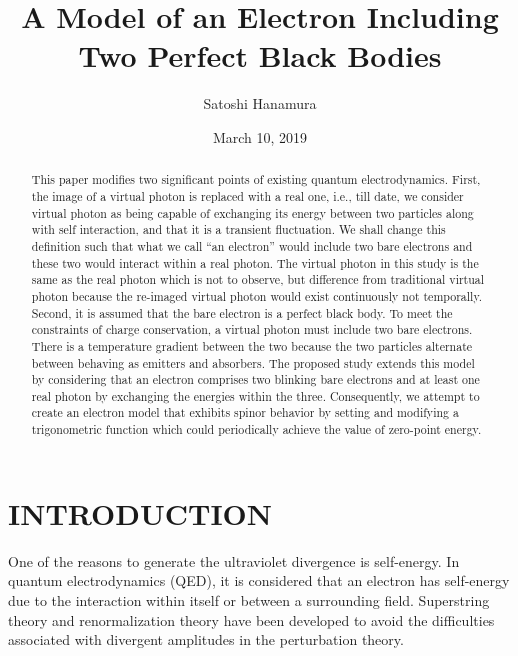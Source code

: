 \documentclass[%
 reprint,
 amsmath,amssymb,
 aps,
]{revtex4-1}
\numberwithin{equation}{section}
\begin{document}

    \title{A Model of an Electron Including Two Perfect Black Bodies}
    \author{Satoshi Hanamura}
    \date{March 10, 2019}
        \begin{abstract}
            This paper modifies two significant points of existing quantum electrodynamics. First, the image of a virtual photon is replaced with a real one, i.e., till date, we consider virtual photon as being capable of exchanging its energy between two particles along with self interaction, and that it is a transient fluctuation. We shall change this definition such that what we call ``an electron'' would include two bare electrons and these two would interact within a real photon. The virtual photon in this study is the same as the real photon which is not to observe, but difference from traditional virtual photon because the re-imaged virtual photon would exist continuously not temporally. Second, it is assumed that the bare electron is a perfect black body. To meet the constraints of charge conservation, a virtual photon must include two bare electrons. There is a temperature gradient between the two because the two particles alternate between behaving as emitters and absorbers. The proposed study extends this model by considering that an electron comprises two blinking bare electrons and at least one real photon by exchanging the energies within the three. Consequently, we attempt to create an electron model that exhibits spinor behavior by setting and modifying a trigonometric function which could periodically achieve the value of zero-point energy.
        \end{abstract}
    \maketitle

\section{\label{sec:INTRODUCTION}INTRODUCTION}

    One of the reasons to generate the ultraviolet divergence is self-energy. In quantum electrodynamics (QED),  it is considered that an electron has self-energy due to the interaction within itself or between a surrounding field. Superstring theory and renormalization theory have been developed to avoid the difficulties associated with divergent amplitudes in the perturbation theory.
\end{document}
